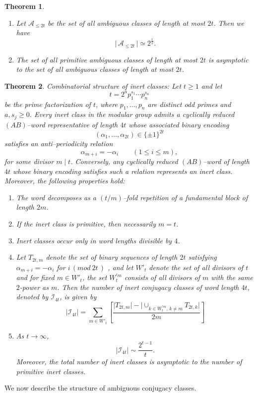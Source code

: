 \documentclass[a4paper,12pt]{amsart}
\numberwithin{equation}{section}
\newtheorem{theorem}{Theorem}[section]
\theoremstyle{definition}
\numberwithin{equation}{section}
\begin{document}
\begin{theorem} \label{ambiguous}

\begin{enumerate}
    \item Let $\mathscr A_{\leq 2t}$ be the set of all ambiguous classes of length at most $2t$. Then we have
\[\lvert\,\mathscr A_{\le 2t}\,\rvert\simeq 2^{\frac{t}{2}}.\]
\item The set of all primitive ambiguous classes of length at most $2t$ is asymptotic to the set of all ambiguous classes of length at most $2t$.
\end{enumerate}
\end{theorem}
\iffalse
\begin{theorem}\label{inert}{Combinatorial structure of inert classes:}
Let $t \ge 1$ and let
\[
t = 2^{a} p_1^{s_1} \cdots p_n^{s_n}
\]
be the prime factorization of $t$, where $p_1,\ldots,p_n$ are distinct odd primes and
$a,s_j \ge 0$. Every inert class in the modular group admits a cyclically
reduced $(AB)$--word representative of length $4t$ whose associated binary encoding
\[
(\alpha_1,\ldots,\alpha_{2t}) \in \{\pm1\}^{2t}
\]
satisfies an anti--periodicity relation
\[
\alpha_{m+i} = -\alpha_i \qquad (1 \le i \le m),
\]
for some divisor $m \mid t$. Conversely, any cyclically reduced $(AB)$--word of length $4t$ whose binary encoding satisfies such a relation represents an inert class.
Moreover, the following properties hold:
\begin{enumerate}
\item The word decomposes as a $(t/m)$--fold repetition of a fundamental block of
length $2m$.
\item If the inert class is primitive, then necessarily $m=t$.
\item Inert classes occur only in word lengths divisible by $4$.
\item Let $T_{2t,m}$ denote the set of binary sequences of length $2t$ satisfying $\alpha_{m+i}=-\alpha_i$ for $i \,(mod~ 2t\,)$ , and let $W'_t$ denote the set of all divisors
of $t$ and for fixed $m \in W'_t$, the set $W_{t}^{'m}$ consists of all divisors of $m$ with the same $2$-power as $m$. Then the number of inert conjugacy classes of word length $4t$, denoted by
$\mathscr{I}_{4t}$, is given by
\[
\lvert \mathscr{I}_{4t} \rvert
= \sum_{m \in W'_t} \left [ \frac{\lvert T_{2t,m} \rvert- \lvert \cup_{k\in W_t^{'m},\, k\neq m}T_{2t,k}\rvert}{2m}\right]
\]
\item As $t \to \infty$,
\[
\lvert \mathscr{I}_{4t} \rvert \sim \frac{2^{t-1}}{t}.
\]
Moreover, the total number of inert classes is asymptotic to the number of primitive inert classes.
\end{enumerate}
\end{theorem}
We now describe the structure of ambiguous conjugacy classes. 
\end{document}
